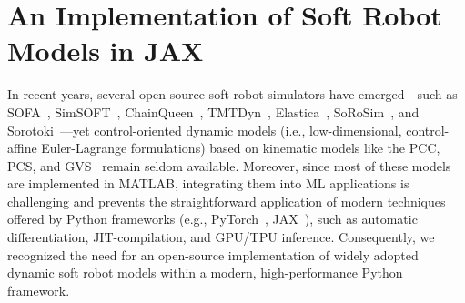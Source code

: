 \section{An Implementation of Soft Robot Models in JAX}\label{sec:apx:infrastructure:jsrm}
In recent years, several open-source soft robot simulators have emerged—such as SOFA~\citep{coevoet2017software}, SimSOFT~\citep{grazioso2019geometrically}, ChainQueen~\citep{hu2019chainqueen}, TMTDyn~\citep{sadati2021tmtdyn}, Elastica~\citep{naughton2021elastica}, SoRoSim~\citep{mathew2022sorosim}, and Sorotoki~\citep{caasenbrood2024sorotoki}—yet control-oriented dynamic models (i.e., low-dimensional, control-affine Euler-Lagrange formulations) based on kinematic models like the \gls{PCC}\citep{webster2010design}, \gls{PCS}\citep{renda2018discrete}, and \gls{GVS}~\citep{boyer2020dynamics, renda2020geometric} remain seldom available. Moreover, since most of these models are implemented in MATLAB, integrating them into \gls{ML} applications is challenging and prevents the straightforward application of modern techniques offered by Python frameworks (e.g., PyTorch~\citep{pytorch}, JAX~\citep{jax2018github}), such as automatic differentiation, \gls{JIT}-compilation, and \gls{GPU}/\gls{TPU} inference.
Consequently, we recognized the need for an open-source implementation of widely adopted dynamic soft robot models within a modern, high-performance Python framework.

